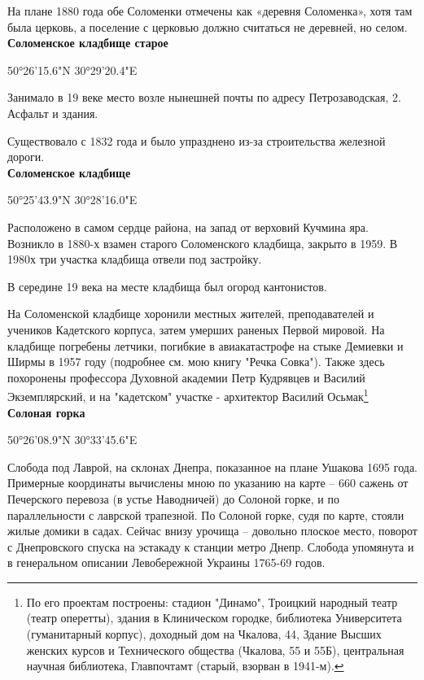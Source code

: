 На плане 1880 года обе Соломенки отмечены как «деревня Соломенка», хотя там была церковь, а поселение с церковью должно считаться не деревней, но селом.\\

\textbf{Соломенское кладбище старое}

50°26'15.6"N 30°29'20.4"E

Занимало в 19 веке место возле нынешней почты по адресу Петрозаводская, 2. Асфальт и здания.

Существовало с 1832 года и было упразднено из-за строительства железной дороги.
\\

\textbf{Соломенское кладбище}

50°25'43.9"N 30°28'16.0"E

Расположено в самом сердце района, на запад от верховий Кучмина яра. Возникло в 1880-х взамен старого Соломенского кладбища, закрыто в 1959. В 1980х три участка кладбища отвели под застройку.

В середине 19 века на месте кладбища был огород кантонистов.

На Соломенской кладбище хоронили местных жителей, преподавателей и учеников Кадетского корпуса, затем умерших раненых Первой мировой. На кладбище погребены летчики, погибкие в авиакатастрофе на стыке Демиевки и Ширмы в 1957 году (подробнее см. мою книгу "Речка Совка"). Также здесь похоронены профессора Духовной академии Петр Кудрявцев и Василий Экземплярский, и на "кадетском" участке - архитектор Василий Осьмак\footnote{По его проектам построены: стадион "Динамо", Троицкий народный театр (театр оперетты), здания в Клиническом городке, библиотека Университета (гуманитарный корпус), доходный дом на Чкалова, 44, Здание Высших женских курсов и Технического общества (Чкалова, 55 и 55Б), центральная научная библиотека, Главпочтамт (старый, взорван в 1941-м).}\\


\textbf{Солоная горка} 

50°26'08.9"N 30°33'45.6"E

Слобода под Лаврой, на склонах Днепра, показанное на плане Ушакова 1695 года. Примерные координаты вычислены мною по указанию на карте – 660 сажень от Печерского перевоза (в устье Наводничей) до Солоной горке, и по параллельности с лаврской трапезной. По Солоной горке, судя по карте, стояли жилые домики в садах. Сейчас внизу урочища – довольно плоское место, поворот с Днепровского спуска на эстакаду к станции метро Днепр. Слобода упомянута и в генеральном описании Левобережной Украины 1765-69 годов.\\

